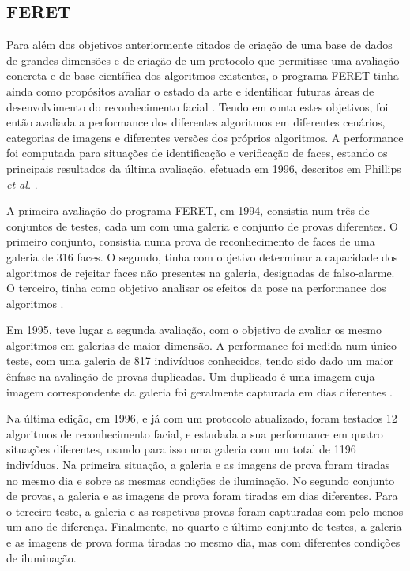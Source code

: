 \subsection{FERET}
Para além dos objetivos anteriormente citados de criação de uma base de dados de grandes dimensões e de criação de um protocolo que permitisse uma avaliação concreta e de base científica dos algoritmos existentes, o programa FERET tinha ainda como propósitos avaliar o estado da arte e identificar futuras áreas de desenvolvimento do reconhecimento facial \cite{Phillips2000}. Tendo em conta estes objetivos, foi então avaliada a performance dos diferentes algoritmos em diferentes cenários, categorias de imagens e diferentes versões dos próprios algoritmos. A performance foi computada para situações de identificação e verificação de faces, estando os principais resultados da última avaliação, efetuada em 1996, descritos em Phillips \textit{et al.} \cite{Phillips2000}.

A primeira avaliação do programa FERET, em 1994, consistia num três de conjuntos de testes, cada um com uma galeria e conjunto de provas diferentes. O primeiro conjunto, consistia numa prova de reconhecimento de faces de uma galeria de 316 faces. O segundo, tinha com objetivo determinar a capacidade dos algoritmos de rejeitar faces não presentes na galeria, designadas de falso-alarme. O terceiro, tinha como objetivo analisar os efeitos da pose na performance dos algoritmos \cite{Phillips2000}.

Em 1995, teve lugar a segunda avaliação, com o objetivo de  avaliar os mesmo algoritmos em galerias de maior dimensão. A performance foi medida num único teste, com uma galeria de 817 indivíduos conhecidos, tendo sido dado um maior ênfase na avaliação de provas duplicadas. Um duplicado é uma imagem cuja imagem correspondente da galeria foi geralmente capturada em dias diferentes  \cite{Phillips2000}.

Na última edição, em 1996, e já com um protocolo atualizado, foram testados 12 algoritmos de reconhecimento facial, e estudada a sua performance em quatro situações diferentes, usando para isso uma galeria com um total de 1196 indivíduos. Na primeira situação, a galeria e as imagens de prova foram tiradas no mesmo dia e sobre as mesmas condições de iluminação. No segundo conjunto de provas, a galeria e as imagens de prova foram tiradas em dias diferentes. Para o terceiro teste, a galeria e as respetivas provas foram capturadas com pelo menos um ano de diferença. Finalmente, no quarto e último conjunto de testes, a galeria e as imagens de prova forma tiradas no mesmo dia, mas com diferentes condições de iluminação.

